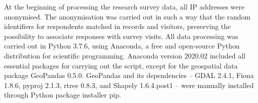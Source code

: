 
At the beginning of processing the research survey data, all IP addresses were anonymised. The anonymisation was carried out in such a way that the random identifiers for respondents matched in records and visitors, preserving the possibility to associate responses with survey visits. All data processing was carried out in Python 3.7.6, using Anaconda, a free and open-source Python distribution for scientific programming. Anaconda version 2020.02 included all essential packages for carrying out the script, except for the geospatial data package GeoPandas 0.5.0. GeoPandas and its dependencies -- GDAL 2.4.1, Fiona 1.8.6, pyproj 2.1.3, rtree 0.8.3, and Shapely 1.6.4.post1 -- were manually installed through Python package installer pip.

